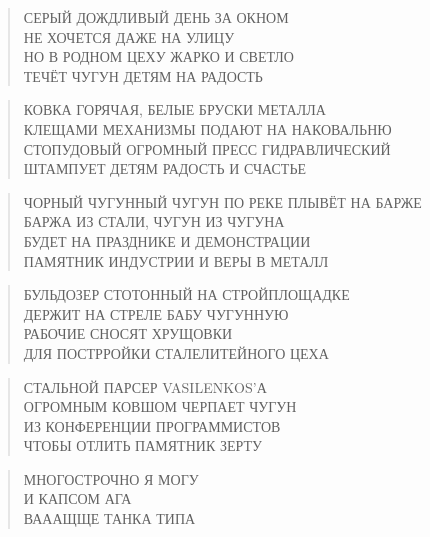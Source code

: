 \poemtitle{***}
\begin{verse}
СЕРЫЙ ДОЖДЛИВЫЙ ДЕНЬ ЗА ОКНОМ\\
НЕ ХОЧЕТСЯ ДАЖЕ НА УЛИЦУ\\
НО В РОДНОМ ЦЕХУ ЖАРКО И СВЕТЛО\\
ТЕЧЁТ ЧУГУН ДЕТЯМ НА РАДОСТЬ
\end{verse}

\poemtitle{***}
\begin{verse}
КОВКА ГОРЯЧАЯ, БЕЛЫЕ БРУСКИ МЕТАЛЛА\\
КЛЕЩАМИ МЕХАНИЗМЫ ПОДАЮТ НА НАКОВАЛЬНЮ\\
СТОПУДОВЫЙ ОГРОМНЫЙ ПРЕСС ГИДРАВЛИЧЕСКИЙ\\
ШТАМПУЕТ ДЕТЯМ РАДОСТЬ И СЧАСТЬЕ
\end{verse}

\poemtitle{***}
\begin{verse}
ЧОРНЫЙ ЧУГУННЫЙ ЧУГУН ПО РЕКЕ ПЛЫВЁТ НА БАРЖЕ\\
БАРЖА ИЗ СТАЛИ, ЧУГУН ИЗ ЧУГУНА\\
БУДЕТ НА ПРАЗДНИКЕ И ДЕМОНСТРАЦИИ\\
ПАМЯТНИК ИНДУСТРИИ И ВЕРЫ В МЕТАЛЛ
\end{verse}

\poemtitle{***}
\begin{verse}
БУЛЬДОЗЕР СТОТОННЫЙ НА СТРОЙПЛОЩАДКЕ\\
ДЕРЖИТ НА СТРЕЛЕ БАБУ ЧУГУННУЮ\\
РАБОЧИЕ СНОСЯТ ХРУЩОВКИ\\
ДЛЯ ПОСТРРОЙКИ СТАЛЕЛИТЕЙНОГО ЦЕХА
\end{verse}

\poemtitle{***}
\begin{verse}
СТАЛЬНОЙ ПАРСЕР VASILENKOS'А\\
ОГРОМНЫМ КОВШОМ ЧЕРПАЕТ ЧУГУН \\
ИЗ КОНФЕРЕНЦИИ ПРОГРАММИСТОВ\\
ЧТОБЫ ОТЛИТЬ ПАМЯТНИК ЗЕРТУ
\end{verse}

\poemtitle{***}
\begin{verse}
МНОГОСТРОЧНО Я МОГУ\\
И КАПСОМ АГА\\
ВАААЩЩЕ ТАНКА ТИПА
\end{verse}

